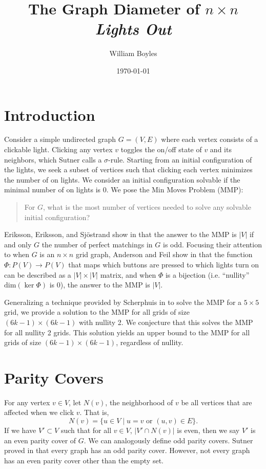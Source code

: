 \documentclass[a4paper]{article}
\newcommand{\abs}[1]{\left| #1 \right|}
\renewcommand{\dim}[1]{\text{dim}\left( #1 \right)}
\begin{document}
	\title{The Graph Diameter of $n \times n$ \textit{Lights Out}}
	\author{William Boyles}
	\date{\today}
	\maketitle
	
	\section{Introduction}
	Consider a simple undirected graph $G=(V,E)$ where each vertex consists of a clickable light.
	Clicking any vertex $v$ toggles the on/off state of $v$ and its neighbors, which Sutner calls a $\sigma$-rule.
	Starting from an initial configuration of the lights, we seek a subset of vertices such that clicking each vertex minimizes the number of on lights.
	We consider an initial configuration solvable if the minimal number of on lights is 0.
	We pose the Min Moves Problem (MMP):
	\begin{quote}
		For $G$, what is the most number of vertices needed to solve any solvable initial configuration?
	\end{quote}
	Eriksson, Eriksson, and Sjöstrand show in \cite{ERIKSSON2001357} that the answer to the MMP is $\abs{V}$ if and only $G$ the number of perfect matchings in $G$ is odd.
	Focusing their attention to when $G$ is an $n \times n$ grid graph, Anderson and Feil show in \cite{anderson_feil} that the function $\Phi: P(V) \to P(V)$ that maps which buttons are pressed to which lights turn on can be described as a $\abs{V} \times \abs{V}$ matrix, and when $\Phi$ is a bijection (i.e. ``nullity'' $\dim{\ker{\Phi}}$ is 0), the answer to the MMP is $\abs{V}$.
	
	Generalizing a technique provided by Scherphuis in \cite{jaap} to solve the MMP for a $5 \times 5$ grid, we provide a solution to the MMP for all grids of size $(6k-1) \times (6k-1)$ with nullity 2.
	We conjecture that this solves the MMP for all nullity 2 grids.
	This solution yields an upper bound to the MMP for all grids of size $(6k-1) \times (6k-1)$, regardless of nullity.
	
	\section{Parity Covers}
	For any vertex $v \in V$, let $N(v)$, the neighborhood of $v$ be all vertices that are affected when we click $v$.
	That is,
	\begin{equation*}
		N(v) = \{u \in V \mid u=v \text{ or } (u,v) \in E\}.
	\end{equation*}
	If we have $V' \subset V$ such that for all $v \in V$, $\abs{V' \cap N(v)}$ is even, then we say $V'$ is an even parity cover of $G$.
	We can analogously define odd parity covers.
	Sutner proved in \cite{Sutner1989} that every graph has an odd parity cover.
	However, not every graph has an even parity cover other than the empty set.
	
\end{document}
